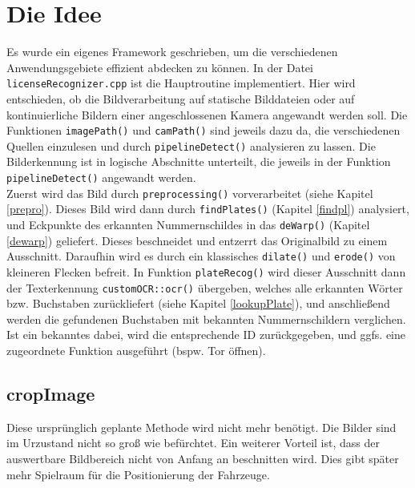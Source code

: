 \documentclass{../Vorlage/sebDenCls}
\begin{document}

\section{Die Idee}
Es wurde ein eigenes Framework geschrieben, um die verschiedenen Anwendungsgebiete effizient abdecken zu können. In der Datei \texttt{licenseRecognizer.cpp} ist die Hauptroutine implementiert.
Hier wird entschieden, ob die Bildverarbeitung auf statische Bilddateien oder auf kontinuierliche Bildern einer angeschlossenen Kamera angewandt werden soll.
Die Funktionen \texttt{imagePath()} und \texttt{camPath()} sind jeweils dazu da, die verschiedenen Quellen einzulesen und durch \texttt{pipelineDetect()} analysieren zu lassen. Die Bilderkennung ist in logische Abschnitte unterteilt, die jeweils in der Funktion \texttt{pipelineDetect()} angewandt werden.\\
Zuerst wird das Bild durch \texttt{preprocessing()} vorverarbeitet (siehe Kapitel \ref{prepro}). Dieses Bild wird dann durch \texttt{findPlates()} (Kapitel \ref{findpl}) analysiert, und Eckpunkte des erkannten Nummernschildes in das \texttt{deWarp()} (Kapitel \ref{dewarp}) geliefert. Dieses beschneidet und entzerrt das Originalbild zu einem Ausschnitt. Daraufhin wird es durch ein klassisches \texttt{dilate()} und \texttt{erode()} von kleineren Flecken befreit. In Funktion \texttt{plateRecog()} wird dieser Ausschnitt dann der Texterkennung \texttt{customOCR::ocr()} übergeben, welches alle erkannten Wörter bzw. Buchstaben zurückliefert (siehe Kapitel \ref{lookupPlate}), und anschließend werden die gefundenen Buchstaben mit bekannten Nummernschildern verglichen. Ist ein bekanntes dabei, wird die entsprechende ID zurückgegeben, und ggfs. eine zugeordnete Funktion ausgeführt (bspw. Tor öffnen).

\subsection{cropImage}
Diese ursprünglich geplante Methode wird nicht mehr benötigt. Die Bilder sind im Urzustand nicht so groß wie befürchtet. Ein weiterer Vorteil ist, dass der auswertbare Bildbereich nicht von Anfang an beschnitten wird. Dies gibt später mehr Spielraum für die Positionierung der Fahrzeuge.
\end{document}
